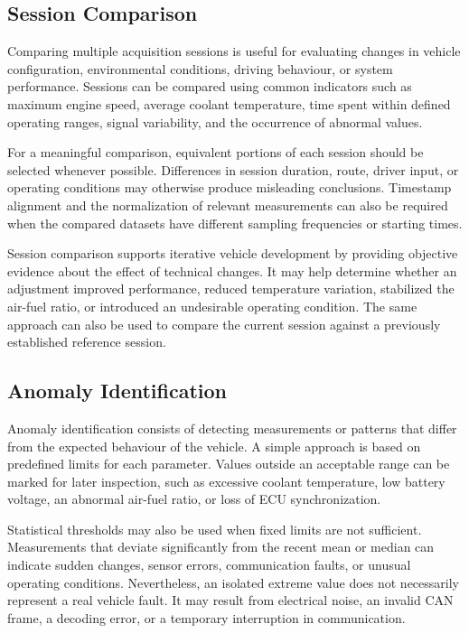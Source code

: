 \subsection{Session Comparison}

Comparing multiple acquisition sessions is useful for evaluating changes in vehicle configuration, environmental conditions, driving behaviour, or system performance. Sessions can be compared using common indicators such as maximum engine speed, average coolant temperature, time spent within defined operating ranges, signal variability, and the occurrence of abnormal values.

For a meaningful comparison, equivalent portions of each session should be selected whenever possible. Differences in session duration, route, driver input, or operating conditions may otherwise produce misleading conclusions. Timestamp alignment and the normalization of relevant measurements can also be required when the compared datasets have different sampling frequencies or starting times.

Session comparison supports iterative vehicle development by providing objective evidence about the effect of technical changes. It may help determine whether an adjustment improved performance, reduced temperature variation, stabilized the air-fuel ratio, or introduced an undesirable operating condition. The same approach can also be used to compare the current session against a previously established reference session.

\subsection{Anomaly Identification}

Anomaly identification consists of detecting measurements or patterns that differ from the expected behaviour of the vehicle. A simple approach is based on predefined limits for each parameter. Values outside an acceptable range can be marked for later inspection, such as excessive coolant temperature, low battery voltage, an abnormal air-fuel ratio, or loss of ECU synchronization.

Statistical thresholds may also be used when fixed limits are not sufficient. Measurements that deviate significantly from the recent mean or median can indicate sudden changes, sensor errors, communication faults, or unusual operating conditions. Nevertheless, an isolated extreme value does not necessarily represent a real vehicle fault. It may result from electrical noise, an invalid CAN frame, a decoding error, or a temporary interruption in communication.

